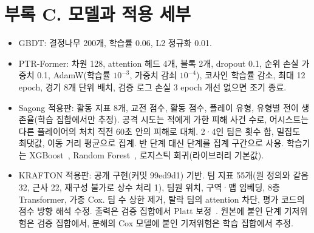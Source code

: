 \section*{부록 C. 모델과 적용 세부}
\begin{itemize}
\item GBDT: 결정나무 200개, 학습률 0.06, L2 정규화 0.01.
\item PTR-Former: 차원 128, attention 헤드 4개, 블록 2개, dropout 0.1, 순위 손실 가중치 0.1, AdamW(학습률 $10^{-3}$, 가중치 감쇠 $10^{-4}$), 코사인 학습률 감소, 최대 12 epoch, 경기 8개 단위 배치, 검증 로그 손실 3 epoch 개선 없으면 조기 종료.
\item Sagong 적용판: 활동 지표 8개, 교전 점수, 활동 점수, 플레이 유형, 유형별 전이 생존율(학습 집합에서만 추정). 공격 시도는 적에게 가한 피해 사건 수로, 어시스트는 다른 플레이어의 처치 직전 60초 안의 피해로 대체. 2·4인 팀은 횟수 합, 밀집도 최댓값, 이동 거리 평균으로 집계. 반 단계 대신 단계를 집계 구간으로 사용. 학습기는 XGBoost~\cite{ChenGuestrin16}, Random Forest~\cite{Breiman01}, 로지스틱 회귀(라이브러리 기본값).
\item KRAFTON 적용판: 공개 구현(커밋 99ed9d1) 기반. 팀 지표 55개(원 정의와 같음 32, 근사 22, 재구성 불가로 상수 처리 1), 팀원 위치, 구역·맵 임베딩, 8층 Transformer, 가중 Cox. 팀 수 상한 제거, 탈락 팀의 attention 차단, 평가 코드의 점수 방향 해석 수정. 출력은 검증 집합에서 Platt 보정~\cite{Platt99}. 원본에 붙인 단계 기저위험은 검증 집합에서, 분해의 Cox 모델에 붙인 기저위험은 학습 집합에서 추정.
\end{itemize}

